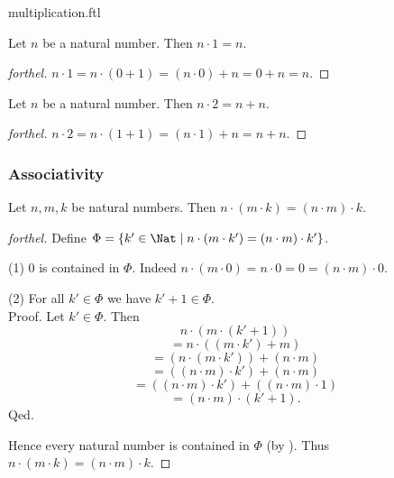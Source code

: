 \documentclass{naproche-library}
\begin{document}
\begin{smodule}{multiplication.ftl}
  \begin{proposition}[forthel,id=ARITHMETIC_06_2910559821365248]
    Let $n$ be a natural number.
    Then $n \cdot 1 = n$.
  \end{proposition}
  \begin{proof}[forthel]
    $n \cdot 1
      = n \cdot (0 + 1)
      = (n \cdot 0) + n
      = 0 + n
      = n$.
  \end{proof}

  \begin{corollary}[forthel,id=ARITHMETIC_06_5679541582299136]
    Let $n$ be a natural number.
    Then $n \cdot 2 = n + n$.
  \end{corollary}
  \begin{proof}[forthel]
    $n \cdot 2
      = n \cdot (1 + 1)
      = (n \cdot 1) + n
      = n + n$.
  \end{proof}


  \subsubsection*{Associativity}

  \begin{proposition}[forthel,id=ARITHMETIC_06_347295585402880]
    Let $n, m, k$ be natural numbers.
    Then $n \cdot (m \cdot k) = (n \cdot m) \cdot k$.
  \end{proposition}
  \begin{proof}[forthel]
    Define $\Phi = \{ k' \in \Nat \mid n \cdot (m \cdot k') = (n \cdot m) \cdot k' \}$.

    (1) $0$ is contained in $\Phi$.
    Indeed $n \cdot (m \cdot 0)
      = n \cdot 0
      = 0
      = (n \cdot m) \cdot 0$.

    (2) For all $k' \in \Phi$ we have $k' + 1 \in \Phi$. \\
    Proof.
      Let $k' \in \Phi$.
      Then
      \[  n \cdot (m \cdot (k' + 1))                          \]
      \[    = n \cdot ((m \cdot k') + m)                      \]
      \[    = (n \cdot (m \cdot k')) + (n \cdot m)            \]
      \[    = ((n \cdot m) \cdot k') + (n \cdot m)            \]
      \[    = ((n \cdot m) \cdot k') + ((n \cdot m) \cdot 1)  \]
      \[    = (n \cdot m) \cdot (k' + 1).                     \]
    Qed.

    Hence every natural number is contained in $\Phi$ (by ).
    Thus $n \cdot (m \cdot k) = (n \cdot m) \cdot k$.
  \end{proof}



\end{smodule}
\end{document}
